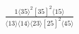 \documentclass[varwidth, border=5pt]{standalone}
\begin{document}
\begin{my}
$\begin{gathered}
\scriptscriptstyle\frac{1⟨35⟩^2[35]^2⟨15⟩}{⟨13⟩⟨14⟩⟨23⟩[25]^2⟨45⟩}
\end{gathered}$
\end{my}
\end{document}
